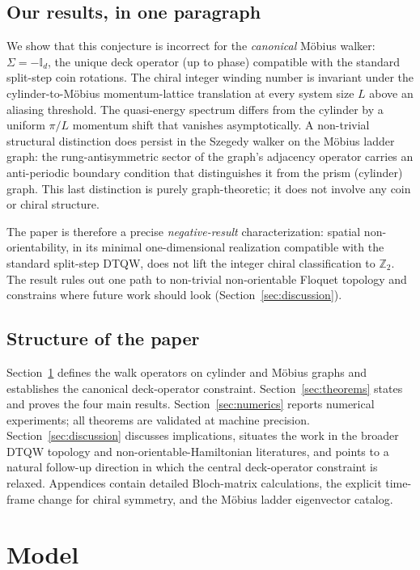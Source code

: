 \documentclass[aps,pra,reprint,amsmath,amssymb,superscriptaddress,nofootinbib,longbibliography]{revtex4-2}
\newcommand{\Z}{\mathbb{Z}}
\newcommand{\I}{\mathbb{I}}
\begin{document}
\subsection{Our results, in one paragraph}

We show that this conjecture is incorrect for the \emph{canonical} M\"obius walker: $\Sigma = -\I_d$, the unique deck operator (up to phase) compatible with the standard split-step coin rotations. The chiral integer winding number is invariant under the cylinder-to-M\"obius momentum-lattice translation at every system size $L$ above an aliasing threshold. The quasi-energy spectrum differs from the cylinder by a uniform $\pi/L$ momentum shift that vanishes asymptotically. A non-trivial structural distinction does persist in the Szegedy walker on the M\"obius ladder graph: the rung-antisymmetric sector of the graph's adjacency operator carries an anti-periodic boundary condition that distinguishes it from the prism (cylinder) graph. This last distinction is purely graph-theoretic; it does not involve any coin or chiral structure.

The paper is therefore a precise \emph{negative-result} characterization: spatial non-orientability, in its minimal one-dimensional realization compatible with the standard split-step DTQW, does not lift the integer chiral classification to $\Z_2$. The result rules out one path to non-trivial non-orientable Floquet topology and constrains where future work should look (Section~\ref{sec:discussion}).

\subsection{Structure of the paper}

Section~\ref{sec:model} defines the walk operators on cylinder and M\"obius graphs and establishes the canonical deck-operator constraint. Section~\ref{sec:theorems} states and proves the four main results. Section~\ref{sec:numerics} reports numerical experiments; all theorems are validated at machine precision. Section~\ref{sec:discussion} discusses implications, situates the work in the broader DTQW topology and non-orientable-Hamiltonian literatures, and points to a natural follow-up direction in which the central deck-operator constraint is relaxed. Appendices contain detailed Bloch-matrix calculations, the explicit time-frame change for chiral symmetry, and the M\"obius ladder eigenvector catalog.


\section{Model}
\label{sec:model}
\end{document}
